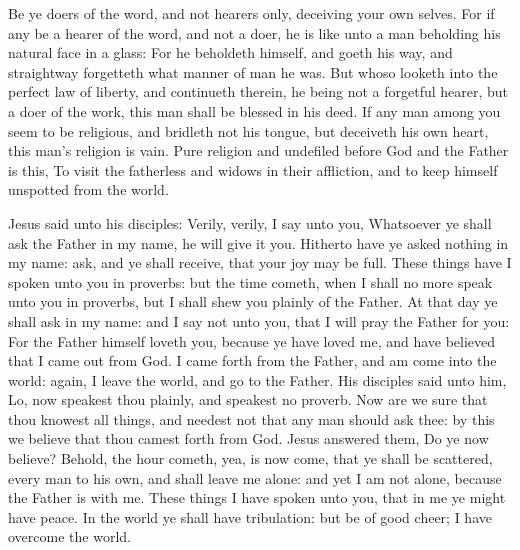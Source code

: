  Be ye doers of the word, and not hearers only, deceiving your own selves. For if any be a hearer of the word, and not a doer, he is like unto a man beholding his natural face in a glass: For he beholdeth himself, and goeth his way, and straightway forgetteth what manner of man he was. But whoso looketh into the perfect law of liberty, and continueth therein, he being not a forgetful hearer, but a doer of the work, this man shall be blessed in his deed. If any man among you seem to be religious, and bridleth not his tongue, but deceiveth his own heart, this man's religion is vain. Pure religion and undefiled before God and the Father is this, To visit the fatherless and widows in their affliction, and to keep himself unspotted from the world.


 Jesus said unto his disciples: Verily, verily, I say unto you, Whatsoever ye shall ask the Father in my name, he will give it you. Hitherto have ye asked nothing in my name: ask, and ye shall receive, that your joy may be full. These things have I spoken unto you in proverbs: but the time cometh, when I shall no more speak unto you in proverbs, but I shall shew you plainly of the Father. At that day ye shall ask in my name: and I say not unto you, that I will pray the Father for you: For the Father himself loveth you, because ye have loved me, and have believed that I came out from God. I came forth from the Father, and am come into the world: again, I leave the world, and go to the Father. His disciples said unto him, Lo, now speakest thou plainly, and speakest no proverb. Now are we sure that thou knowest all things, and needest not that any man should ask thee: by this we believe that thou camest forth from God. Jesus answered them, Do ye now believe? Behold, the hour cometh, yea, is now come, that ye shall be scattered, every man to his own, and shall leave me alone: and yet I am not alone, because the Father is with me. These things I have spoken unto you, that in me ye might have peace. In the world ye shall have tribulation: but be of good cheer; I have overcome the world.


